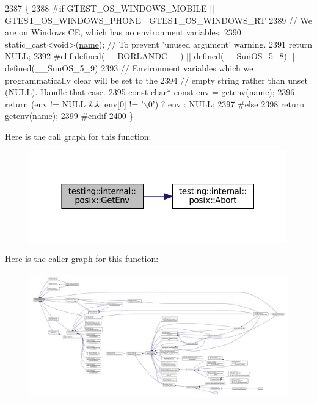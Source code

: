 \begin{DoxyCode}
2387                                             \{
2388 \textcolor{preprocessor}{#if GTEST\_OS\_WINDOWS\_MOBILE || GTEST\_OS\_WINDOWS\_PHONE | GTEST\_OS\_WINDOWS\_RT}
2389   \textcolor{comment}{// We are on Windows CE, which has no environment variables.}
2390   \textcolor{keyword}{static\_cast<}\textcolor{keywordtype}{void}\textcolor{keyword}{>}(\hyperlink{namespaceinteractive__marker_a447655961b3d3ca3c5a2a9d3d769436d}{name});  \textcolor{comment}{// To prevent 'unused argument' warning.}
2391   \textcolor{keywordflow}{return} NULL;
2392 \textcolor{preprocessor}{#elif defined(\_\_BORLANDC\_\_) || defined(\_\_SunOS\_5\_8) || defined(\_\_SunOS\_5\_9)}
2393   \textcolor{comment}{// Environment variables which we programmatically clear will be set to the}
2394   \textcolor{comment}{// empty string rather than unset (NULL).  Handle that case.}
2395   \textcolor{keyword}{const} \textcolor{keywordtype}{char}* \textcolor{keyword}{const} env = getenv(\hyperlink{namespaceinteractive__marker_a447655961b3d3ca3c5a2a9d3d769436d}{name});
2396   \textcolor{keywordflow}{return} (env != NULL && env[0] != \textcolor{charliteral}{'\(\backslash\)0'}) ? env : NULL;
2397 \textcolor{preprocessor}{#else}
2398   \textcolor{keywordflow}{return} getenv(\hyperlink{namespaceinteractive__marker_a447655961b3d3ca3c5a2a9d3d769436d}{name});
2399 \textcolor{preprocessor}{#endif}
2400 \}
\end{DoxyCode}
Here is the call graph for this function\+:
\nopagebreak
\begin{figure}[H]
\begin{center}
\leavevmode
\includegraphics[width=316pt]{namespacetesting_1_1internal_1_1posix_a1d5e3da5a27eed25986859fa83cafe95_cgraph}
\end{center}
\end{figure}
Here is the caller graph for this function\+:
\nopagebreak
\begin{figure}[H]
\begin{center}
\leavevmode
\includegraphics[width=350pt]{namespacetesting_1_1internal_1_1posix_a1d5e3da5a27eed25986859fa83cafe95_icgraph}
\end{center}
\end{figure}
